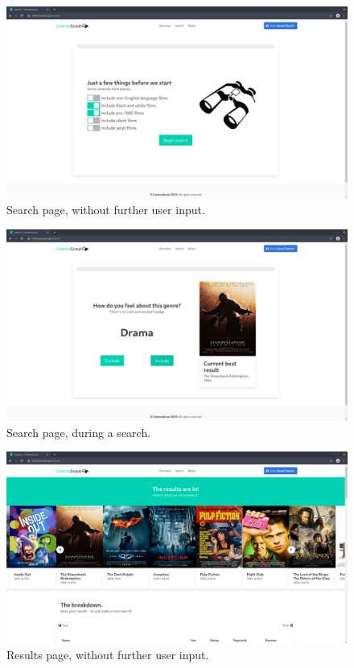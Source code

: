 \documentclass{article}
\begin{document}
\begin{figure}[H]
\includegraphics[width=\columnwidth]{res/search_0.png}
\caption{Search page, without further user input.}
\end{figure}
\begin{figure}[H]
\includegraphics[width=\columnwidth]{res/search_1.png}
\caption{Search page, during a search.}
\end{figure}
\begin{figure}[H]
\includegraphics[width=\columnwidth]{res/results_0.png}
\caption{Results page, without further user input.}
\end{figure}
\end{document}
